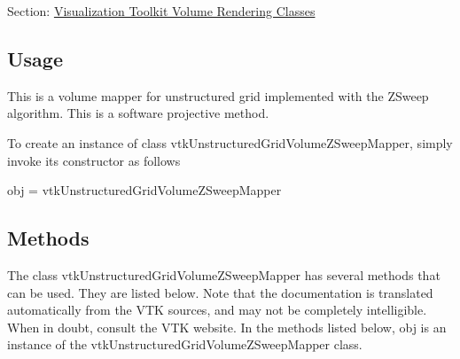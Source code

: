 Section\-: \hyperlink{sec_vtkvolumerendering}{Visualization Toolkit Volume Rendering Classes} \hypertarget{vtkwidgets_vtkxyplotwidget_Usage}{}\subsection{Usage}\label{vtkwidgets_vtkxyplotwidget_Usage}
This is a volume mapper for unstructured grid implemented with the Z\-Sweep algorithm. This is a software projective method.

To create an instance of class vtk\-Unstructured\-Grid\-Volume\-Z\-Sweep\-Mapper, simply invoke its constructor as follows \begin{DoxyVerb}  obj = vtkUnstructuredGridVolumeZSweepMapper
\end{DoxyVerb}
 \hypertarget{vtkwidgets_vtkxyplotwidget_Methods}{}\subsection{Methods}\label{vtkwidgets_vtkxyplotwidget_Methods}
The class vtk\-Unstructured\-Grid\-Volume\-Z\-Sweep\-Mapper has several methods that can be used. They are listed below. Note that the documentation is translated automatically from the V\-T\-K sources, and may not be completely intelligible. When in doubt, consult the V\-T\-K website. In the methods listed below, {\ttfamily obj} is an instance of the vtk\-Unstructured\-Grid\-Volume\-Z\-Sweep\-Mapper class. 
